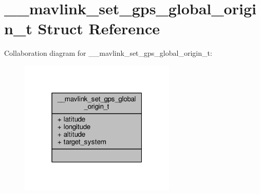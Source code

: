 \hypertarget{struct____mavlink__set__gps__global__origin__t}{\section{\+\_\+\+\_\+mavlink\+\_\+set\+\_\+gps\+\_\+global\+\_\+origin\+\_\+t Struct Reference}
\label{struct____mavlink__set__gps__global__origin__t}
}


Collaboration diagram for \+\_\+\+\_\+mavlink\+\_\+set\+\_\+gps\+\_\+global\+\_\+origin\+\_\+t\+:
\nopagebreak
\begin{figure}[H]
\begin{center}
\leavevmode
\includegraphics[width=211pt]{struct____mavlink__set__gps__global__origin__t__coll__graph}
\end{center}
\end{figure}
